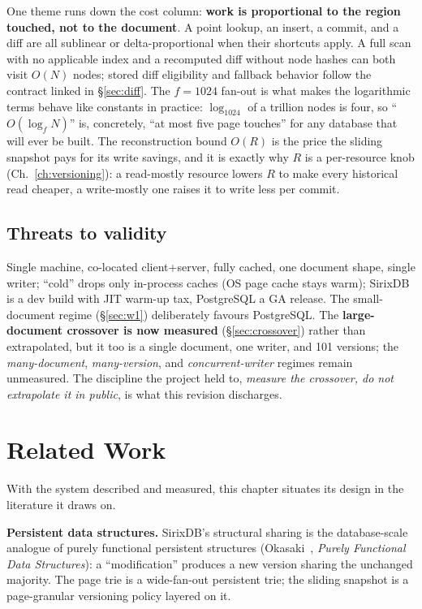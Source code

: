 \documentclass[11pt,a4paper,oneside]{report}
\theoremstyle{sirixthm}
\begin{document}
\noindent One theme runs down the cost column: \textbf{work is proportional to the region touched, not
to the document}. A point lookup, an insert, a commit, and a diff are all sublinear or
delta-proportional when their shortcuts apply. A full scan with no applicable index and a
recomputed diff without node hashes can both visit $O(N)$ nodes; stored diff eligibility and fallback
behavior follow the contract linked in \S\ref{sec:diff}. The $f{=}1024$ fan-out
is what makes the logarithmic terms behave like constants in practice: $\log_{1024}$ of a trillion
nodes is four, so ``$O(\log_f N)$'' is, concretely, ``at most five page touches'' for any database that
will ever be built. The reconstruction bound $O(R)$ is the price the sliding snapshot pays for its
write savings, and it is exactly why $R$ is a per-resource knob (Ch.~\ref{ch:versioning}): a
read-mostly resource lowers $R$ to make every historical read cheaper, a write-mostly one raises it to
write less per commit.

\section{Threats to validity}

Single machine, co-located client{+}server, fully cached, one document shape, single writer;
``cold'' drops only in-process caches (OS page cache stays warm); SirixDB is a dev build with
JIT warm-up tax, PostgreSQL a GA release. The small-document regime (\S\ref{sec:w1}) deliberately
favours PostgreSQL. The \textbf{large-document crossover is now measured} (\S\ref{sec:crossover}) rather
than extrapolated, but it too is a single document, one writer, and 101 versions; the
\emph{many-document}, \emph{many-version}, and \emph{concurrent-writer} regimes remain unmeasured. The
discipline the project held to, \emph{measure the crossover, do not extrapolate it in public}, is what
this revision discharges.

\chapter{Related Work}
\label{ch:related}

With the system described and measured, this chapter situates its design in the literature it draws on.

\textbf{Persistent data structures.} SirixDB's structural sharing is the database-scale
analogue of purely functional persistent structures (Okasaki~\cite{okasaki}, \emph{Purely Functional
Data Structures}): a ``modification'' produces a new version sharing the unchanged majority. The
page trie is a wide-fan-out persistent trie; the sliding snapshot is a page-granular
versioning policy layered on it.
\end{document}
